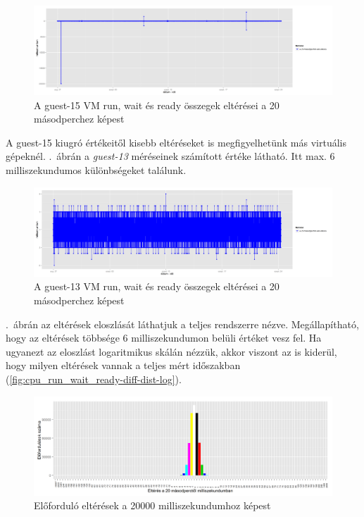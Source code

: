\documentclass[a4paper,10pt,titlepage]{article}
\begin{document}
\begin{figure}[h!]
\centering
\includegraphics[width=1.00\textwidth]{figures/cpu_run_wait_ready-diff-guest-15-20120826230140-20120924083120.png}
\caption{ A guest-15 VM run, wait és ready összegek eltérései a 20 másodperchez képest \label{fig:cpu_run_wait_ready-diff-guest-15}}
\end{figure}

A guest-15 kiugró értékeitől kisebb eltéréseket is megfigyelhetünk más virtuális gépeknél. .~ábrán a \textit{guest-13} méréseinek számított értéke látható. Itt max. 6 milliszekundumos különbségeket találunk.

\begin{figure}[h!]
\centering
\includegraphics[width=1.00\textwidth]{figures/cpu_run_wait_ready-diff-guest-13-20120826230140-20120924083120.png}
\caption{ A guest-13 VM run, wait és ready összegek eltérései a 20 másodperchez képest \label{fig:cpu_run_wait_ready-diff-guest-13}}
\end{figure}

.~ábrán az eltérések eloszlását láthatjuk a teljes rendszerre nézve. Megállapítható, hogy az eltérések többsége 6 milliszekundumon belüli értéket vesz fel. Ha ugyanezt az eloszlást logaritmikus skálán nézzük, akkor viszont az is kiderül, hogy milyen eltérések vannak a teljes mért időszakban (\ref{fig:cpu_run_wait_ready-diff-dist-log}).

\begin{figure}[h!]
\centering
\includegraphics[width=1.00\textwidth]{figures/cpu_run_wait_ready-diff-dist-20120826230140-20120924083120.png}
\caption{ Előforduló eltérések a 20000 milliszekundumhoz képest \label{fig:cpu_run_wait_ready-diff-dist}}
\end{figure}
\end{document}
